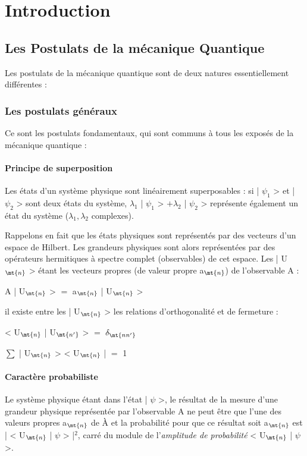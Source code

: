 

 \chapter{Introduction}
\section{Les Postulats de la mécanique Quantique}

Les postulats de la mécanique quantique sont de deux
natures essentiellement différentes :
\subsection{Les postulats généraux}
Ce sont les postulats fondamentaux, qui
sont communs à tous les exposés de la mécanique quantique :

\subsubsection{Principe de superposition}
Les états d'un système
physique sont linéairement superposables : si | $\psi_1$ > et | $\psi_2$ > sont
deux états du système, $\lambda_1$ | $\psi_1$ > $+ \lambda_2$ | $\psi_2$ >
représente également un état du système ($\lambda_1, \lambda_2$ complexes).

Rappelons en fait que les états physiques sont représentés
par des vecteurs d'un espace de Hilbert. Les grandeurs physiques sont
alors représentées par des opérateurs hermitiques à spectre complet
(observables) de cet espace. Les | U$_\mt{n}$ > étant les vecteurs propres
(de valeur propre a$_\mt{n}$) de l'observable A :
\begin{center}
A | U$_\mt{n}$ > $=$ a$_\mt{n}$ | U$_\mt{n}$ >
\end{center}
il existe entre les | U$_\mt{n}$ > les relations d'orthogonalité et de
fermeture :
\begin{center}
< U$_\mt{n}$ | U$_\mt{n'}$ > $=$ $\delta_\mt{nn'}$

$\sum$ | U$_\mt{n}$ > < U$_\mt{n}$ | $=$ 1
\end{center}

\subsubsection{Caractère probabiliste}
Le système physique étant dans
l'état | $\psi$ >, le résultat de la mesure d'une grandeur physique représentée
par l'observable A ne peut être que l'une des valeurs propres
a$_\mt{n}$ de À et la probabilité pour que ce résultat soit a$_\mt{n}$ est
| < U$_\mt{n}$ | $\psi$ > |$^2$, carré du module de l'{\it amplitude de probabilité}
< U$_\mt{n}$ | $\psi$ >.

